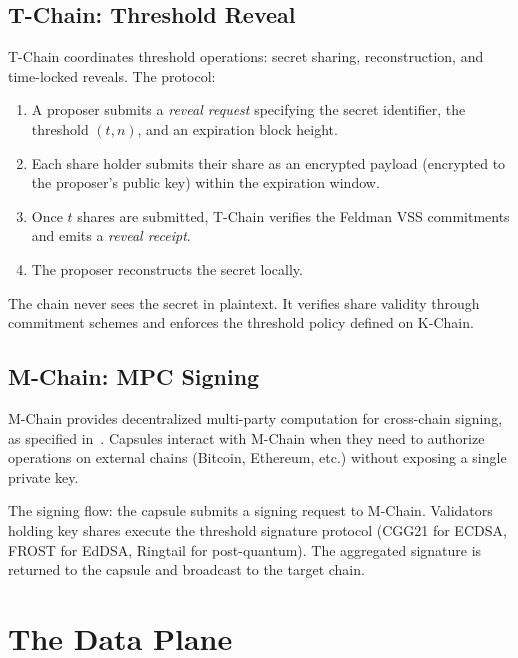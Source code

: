 \documentclass[11pt,a4paper]{article}
\begin{document}
\subsection{T-Chain: Threshold Reveal}\label{sec:tchain}

T-Chain coordinates threshold operations: secret sharing, reconstruction, and
time-locked reveals. The protocol:

\begin{enumerate}[nosep]
  \item A proposer submits a \textit{reveal request} specifying the secret
        identifier, the threshold $(t, n)$, and an expiration block height.
  \item Each share holder submits their share as an encrypted payload
        (encrypted to the proposer's public key) within the expiration window.
  \item Once $t$ shares are submitted, T-Chain verifies the Feldman VSS
        commitments and emits a \textit{reveal receipt}.
  \item The proposer reconstructs the secret locally.
\end{enumerate}

The chain never sees the secret in plaintext. It verifies share validity
through commitment schemes and enforces the threshold policy defined on K-Chain.

\subsection{M-Chain: MPC Signing}\label{sec:mchain}

M-Chain provides decentralized multi-party computation for cross-chain signing,
as specified in~\cite{lux-mchain-mpc}. Capsules interact with M-Chain when they
need to authorize operations on external chains (Bitcoin, Ethereum, etc.) without
exposing a single private key.

The signing flow: the capsule submits a signing request to M-Chain. Validators
holding key shares execute the threshold signature protocol (CGG21 for ECDSA,
FROST for EdDSA, Ringtail for post-quantum). The aggregated signature is
returned to the capsule and broadcast to the target chain.

\section{The Data Plane}\label{sec:data}
\end{document}
